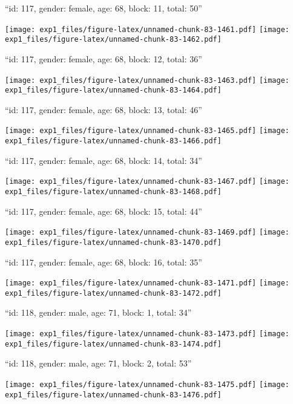 \documentclass[11pt,,]{article}
\begin{document}
\newpage
[1] 

``id: 117, gender: female, age: 68, block: 11, total: 50''

\texttt{[image: exp1\_files/figure-latex/unnamed-chunk-83-1461.pdf]}
\texttt{[image: exp1\_files/figure-latex/unnamed-chunk-83-1462.pdf]}

\newpage
[1] 

``id: 117, gender: female, age: 68, block: 12, total: 36''

\texttt{[image: exp1\_files/figure-latex/unnamed-chunk-83-1463.pdf]}
\texttt{[image: exp1\_files/figure-latex/unnamed-chunk-83-1464.pdf]}

\newpage
[1] 

``id: 117, gender: female, age: 68, block: 13, total: 46''

\texttt{[image: exp1\_files/figure-latex/unnamed-chunk-83-1465.pdf]}
\texttt{[image: exp1\_files/figure-latex/unnamed-chunk-83-1466.pdf]}

\newpage
[1] 

``id: 117, gender: female, age: 68, block: 14, total: 34''

\texttt{[image: exp1\_files/figure-latex/unnamed-chunk-83-1467.pdf]}
\texttt{[image: exp1\_files/figure-latex/unnamed-chunk-83-1468.pdf]}

\newpage
[1] 

``id: 117, gender: female, age: 68, block: 15, total: 44''

\texttt{[image: exp1\_files/figure-latex/unnamed-chunk-83-1469.pdf]}
\texttt{[image: exp1\_files/figure-latex/unnamed-chunk-83-1470.pdf]}

\newpage
[1] 

``id: 117, gender: female, age: 68, block: 16, total: 35''

\texttt{[image: exp1\_files/figure-latex/unnamed-chunk-83-1471.pdf]}
\texttt{[image: exp1\_files/figure-latex/unnamed-chunk-83-1472.pdf]}

\newpage
[1] 

``id: 118, gender: male, age: 71, block: 1, total: 34''

\texttt{[image: exp1\_files/figure-latex/unnamed-chunk-83-1473.pdf]}
\texttt{[image: exp1\_files/figure-latex/unnamed-chunk-83-1474.pdf]}

\newpage
[1] 

``id: 118, gender: male, age: 71, block: 2, total: 53''

\texttt{[image: exp1\_files/figure-latex/unnamed-chunk-83-1475.pdf]}
\texttt{[image: exp1\_files/figure-latex/unnamed-chunk-83-1476.pdf]}
\end{document}

